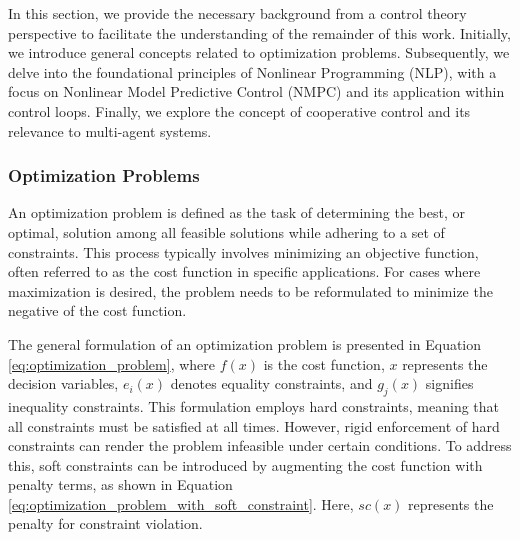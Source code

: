 In this section, we provide the necessary background from a control theory perspective to facilitate the understanding of the remainder of this work. Initially, we introduce general concepts related to optimization problems. Subsequently, we delve into the foundational principles of Nonlinear Programming (NLP), with a focus on Nonlinear Model Predictive Control (NMPC) and its application within control loops. Finally, we explore the concept of cooperative control and its relevance to multi-agent systems.

\subsubsection{Optimization Problems}

An optimization problem is defined as the task of determining the best, or optimal, solution among all feasible solutions while adhering to a set of constraints. This process typically involves minimizing an objective function, often referred to as the cost function in specific applications. For cases where maximization is desired, the problem needs to be reformulated to minimize the negative of the cost function.

The general formulation of an optimization problem is presented in Equation \ref{eq:optimization_problem}, where \( f(x) \) is the cost function, \( x \) represents the decision variables, \( e_i(x) \) denotes equality constraints, and \( g_j(x) \) signifies inequality constraints. This formulation employs hard constraints, meaning that all constraints must be satisfied at all times. However, rigid enforcement of hard constraints can render the problem infeasible under certain conditions. To address this, soft constraints can be introduced by augmenting the cost function with penalty terms, as shown in Equation \ref{eq:optimization_problem_with_soft_constraint}. Here, \( sc(x) \) represents the penalty for constraint violation.

